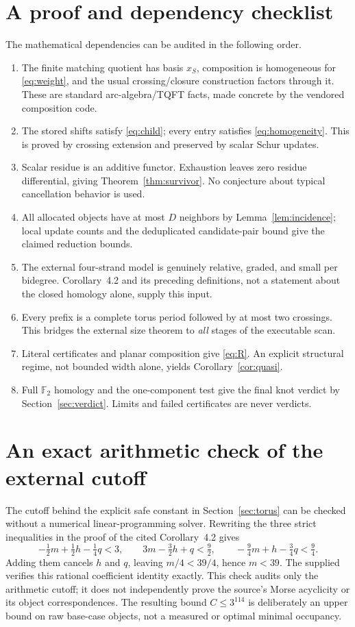 \documentclass[11pt,letterpaper]{article}
\theoremstyle{remark}\newtheorem{remark}[theorem]{Remark}
\newcommand{\F}{\mathbb F}
\begin{document}
\section{A proof and dependency checklist}
The mathematical dependencies can be audited in the following order.
\begin{enumerate}[leftmargin=*,itemsep=4pt]
\item The finite matching quotient has basis $x_S$, composition is homogeneous for \eqref{eq:weight}, and the usual crossing/closure construction factors through it. These are standard arc-algebra/TQFT facts, made concrete by the vendored composition code.
\item The stored shifts satisfy \eqref{eq:child}; every entry satisfies \eqref{eq:homogeneity}. This is proved by crossing extension and preserved by scalar Schur updates.
\item Scalar residue is an additive functor. Exhaustion leaves zero residue differential, giving Theorem~\ref{thm:survivor}. No conjecture about typical cancellation behavior is used.
\item All allocated objects have at most $D$ neighbors by Lemma~\ref{lem:incidence}; local update counts and the deduplicated candidate-pair bound give the claimed reduction bounds.
\item The external four-strand model is genuinely relative, graded, and small per bidegree. Corollary~4.2 and its preceding definitions, not a statement about the closed homology alone, supply this input.
\item Every prefix is a complete torus period followed by at most two crossings. This bridges the external size theorem to \emph{all} stages of the executable scan.
\item Literal certificates and planar composition give \eqref{eq:R}. An explicit structural regime, not bounded width alone, yields Corollary~\ref{cor:quasi}.
\item Full $\F_2$ homology and the one-component test give the final knot verdict by Section~\ref{sec:verdict}. Limits and failed certificates are never verdicts.
\end{enumerate}

\section{An exact arithmetic check of the external cutoff}
The cutoff behind the explicit safe constant in Section~\ref{sec:torus} can be checked without a numerical linear-programming solver. Rewriting the three strict inequalities in the proof of the cited Corollary~4.2 gives
\[
 -\tfrac12 m+\tfrac12 h-\tfrac14 q<3,\qquad
 3m-\tfrac32 h+q<\tfrac92,\qquad
 -\tfrac94 m+h-\tfrac34 q<\tfrac94.
\]
Adding them cancels $h$ and $q$, leaving $m/4<39/4$, hence $m<39$. The supplied  verifies this rational coefficient identity exactly. This check audits only the arithmetic cutoff; it does not independently prove the source's Morse acyclicity or its object correspondences. The resulting bound $C\le3^{114}$ is deliberately an upper bound on raw base-case objects, not a measured or optimal minimal occupancy.
\end{document}
